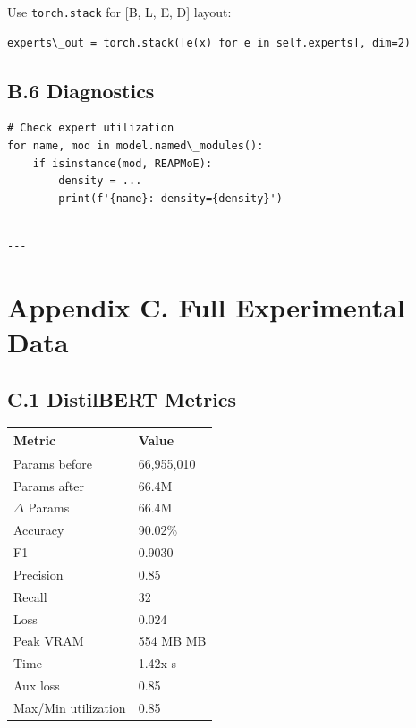 Use \texttt{torch.stack} for [B, L, E, D] layout:

\begin{lstlisting}
experts\_out = torch.stack([e(x) for e in self.experts], dim=2)
\end{lstlisting}

\subsection{B.6 Diagnostics}

\begin{lstlisting}
# Check expert utilization
for name, mod in model.named\_modules():
    if isinstance(mod, REAPMoE):
        density = ...
        print(f'{name}: density={density}')
\end{lstlisting}
\begin{lstlisting}

---
\end{lstlisting}

\section{Appendix C. Full Experimental Data}

\subsection{C.1 DistilBERT Metrics}

\begin{table}[H]
\centering
\small
\begin{tabular}{ll}
\toprule
\textbf{Metric} & \textbf{Value} \\
\midrule
Params before & 66,955,010 \\
Params after & 66.4M \\
$\Delta$ Params & 66.4M \\
Accuracy & 90.02\% \\
F1 & 0.9030 \\
Precision & 0.85 \\
Recall & 32 \\
Loss & 0.024 \\
Peak VRAM & 554 MB MB \\
Time & 1.42x s \\
Aux loss & 0.85 \\
Max/Min utilization & 0.85 \\
\bottomrule
\end{tabular}
\end{table}

